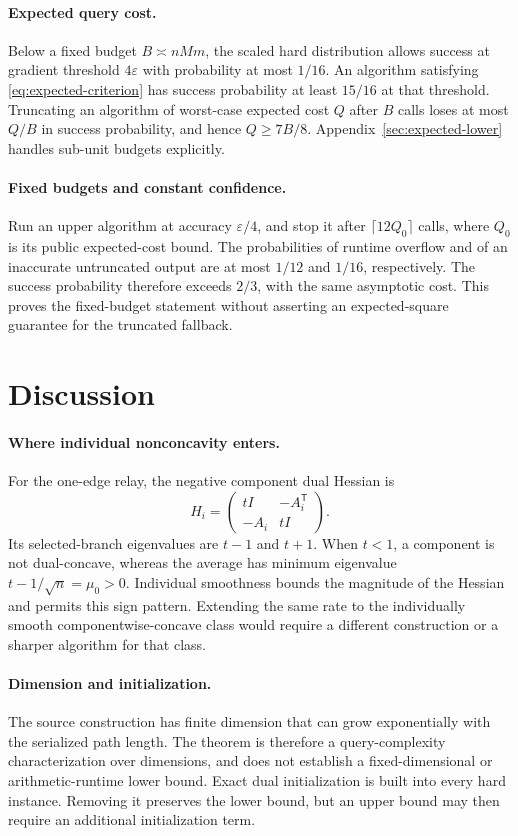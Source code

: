 \documentclass[11pt,letterpaper]{article}
\theoremstyle{definition}
\theoremstyle{remark}
\begin{document}
\paragraph{Expected query cost.}
Below a fixed budget $B\asymp nMm$, the scaled hard distribution allows
success at gradient threshold $4\varepsilon$ with probability at most
$1/16$. An algorithm satisfying \eqref{eq:expected-criterion} has success
probability at least $15/16$ at that threshold. Truncating an algorithm of
worst-case expected cost $Q$ after $B$ calls loses at most $Q/B$ in success
probability, and hence $Q\ge7B/8$. Appendix~\ref{sec:expected-lower}
handles sub-unit budgets explicitly.

\paragraph{Fixed budgets and constant confidence.}
Run an upper algorithm at accuracy $\varepsilon/4$, and stop it after
$\lceil12Q_0\rceil$ calls, where $Q_0$ is its public expected-cost bound.
The probabilities of runtime overflow and of an inaccurate untruncated
output are at most $1/12$ and $1/16$, respectively. The success probability
therefore exceeds $2/3$, with the same asymptotic cost. This proves the
fixed-budget statement without asserting an expected-square guarantee for
the truncated fallback.

\section{Discussion}
\label{sec:discussion}

\paragraph{Where individual nonconcavity enters.}
For the one-edge relay, the negative component dual Hessian is
\[
 H_i=\begin{pmatrix}tI&-A_i^{\mathsf T}\\-A_i&tI\end{pmatrix}.
\]
Its selected-branch eigenvalues are $t-1$ and $t+1$. When $t<1$, a component
is not dual-concave, whereas the average has minimum eigenvalue
$t-1/\sqrt n=\mu_0>0$. Individual smoothness bounds the magnitude of the
Hessian and permits this sign pattern. Extending the same rate to the
individually smooth componentwise-concave class would require a different
construction or a sharper algorithm for that class.

\paragraph{Dimension and initialization.}
The source construction has finite dimension that can grow exponentially
with the serialized path length. The theorem is therefore a query-complexity
characterization over dimensions, and does not establish a fixed-dimensional
or arithmetic-runtime lower bound. Exact dual initialization is built into
every hard instance. Removing it preserves the lower bound, but an upper
bound may then require an additional initialization term.
\end{document}
